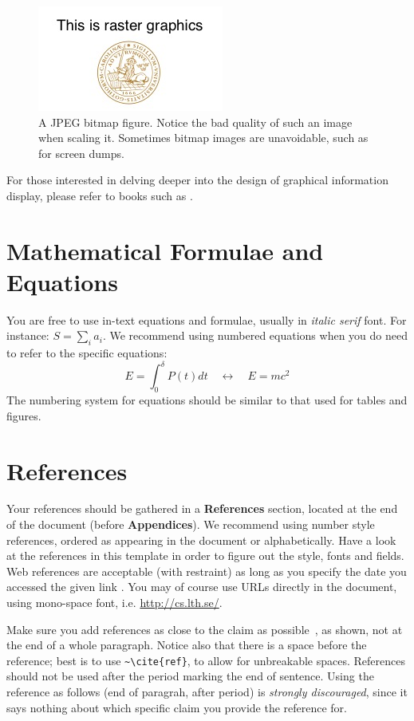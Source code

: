 \documentclass[nofilelist]{cslthse-msc}
\begin{document}
\begin{appendices}
\begin{figure}[!hbt]
\centering
\includegraphics[scale=2.5]{images/examplepic3.jpg} 
\caption{A JPEG bitmap figure. Notice the bad quality of such an image when scaling it. Sometimes bitmap images are unavoidable, such as for screen dumps.}\label{fig:rasterg}
\end{figure}
For those interested in delving deeper into the design of graphical information display, please refer to books such as \cite{Tufte:1986, few2012show}.

\section{Mathematical Formulae and Equations}
You are free to use in-text equations and formulae, usually in \textit{italic serif} font. For instance: $S = \sum_i a_i$. We recommend using numbered equations when you do need to refer to the specific equations:
\begin{equation}
E = \int_0^{\delta} P(t) dt \quad \longleftrightarrow \quad E = m c^2
\end{equation}
The numbering system for equations should be similar to that used for tables and figures.

\section{References}
Your references should be gathered in a \textbf{References} section, located at the end of the document (before \textbf{Appendices}). We recommend using number style references, ordered as appearing in the document or alphabetically. Have a look at the references in this template in order to figure out the style, fonts and fields. Web references are acceptable (with restraint) as long as you specify the date you accessed the given link \cite{fontspec, CTAN}. You may of course use URLs directly in the document, using mono-space font, i.e. \url{http://cs.lth.se/}.

Make sure you add references as close to the claim as possible~\cite{CTAN}, as shown, not at the end of a whole paragraph. Notice also that there is a space before the reference; best is to use \verb+~\cite{ref}+, to allow for unbreakable spaces. References should not be used after the period marking the end of sentence. Using the reference as follows (end of paragrah, after period) is {\em{strongly discouraged}}, since it says nothing about which specific claim you provide the reference for. \cite{fontspec} 


\end{appendices}
\end{document}
